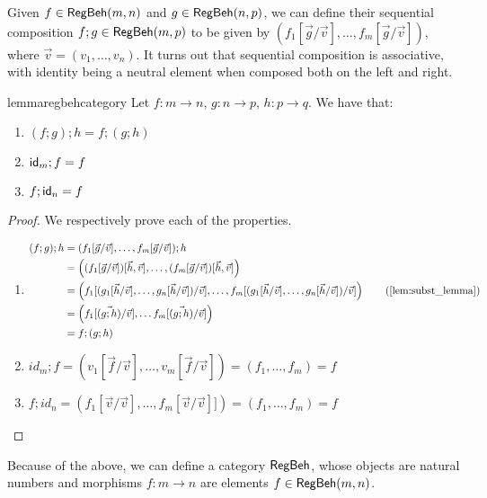 	Given $f \in \mathsf{RegBeh}(m,n)$ and $g \in \mathsf{RegBeh}(n,p)$, we can define their sequential composition $f;g \in \mathsf{RegBeh}(m,p)$ to be given by $(f_1[\vec{g} / \vec{v}], \dots, f_m[\vec{g}/ \vec{v}])$, where $\vec{v}=(v_1, \dots, v_n)$. It turns out that sequential composition is associative, with identity being a neutral element when composed both on the left and right.
 \begin{restatable}{lemma}{regbehcategory}\label{lem:comp_associative}
	Let $f \colon m \to n$, $g \colon n \to p$, $h \colon p \to q$. We have that: 
	\begin{enumerate}
		\item $(f;g);h = f;(g;h)$
		\item $\mathsf{id}_m ; f = f$
		\item $f ; \mathsf{id}_n = f$
	\end{enumerate}	
\end{restatable}
\begin{proof}
	We respectively prove each of the properties.
	\begin{enumerate}
		\item \begin{align*}
			(f ; g) ; h &= (f_1[\vec{g}/\vec{v}], \dots, f_m[\vec{g}/\vec{v}]);h \\
			&= \left((f_1[\vec{g}/\vec{v}])[\vec{h}, \vec{v}], \dots, (f_m[\vec{g}/\vec{v}])[\vec{h}, \vec{v}]\right)\\
			&= \left(f_1[(g_1[\vec{h}/\vec{v}], \dots, g_n[\vec{h}/\vec{v}])/\vec{v}],\dots, f_m[(g_1[\vec{h}/\vec{v}], \dots, g_n[\vec{h}/\vec{v}])/\vec{v}]\right) \tag{\Cref{lem:subst_lemma}} \\
			&= \left(f_1 [\vec{(g;h)}/\vec{v}], \dots f_m [\vec{(g;h)}/\vec{v}] \right) \\
			&= f ; (g;h)
		\end{align*}
		\item $id_m ; f = (v_1[\vec{f}/\vec{v}], \dots, v_m[\vec{f}/\vec{v}])=(f_1, \dots, f_m) = f$
		\item $f ; id_n = (f_1[\vec{v}/\vec{v}], \dots, f_m[\vec{v}/\vec{v}]]) = (f_1, \dots, f_m) = f$
	\end{enumerate}
\end{proof}

Because of the above, we can define a category $\mathsf{RegBeh}$, whose objects are natural numbers and morphisms $f \colon m \to n$ are elements $f \in \mathsf{RegBeh}(m,n)$. 

